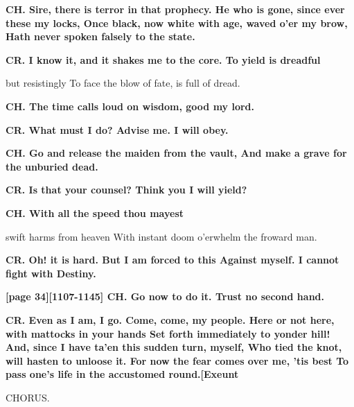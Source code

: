 \documentclass[11pt,letter]{book}
\begin{document}
\par \textbf{CH. Sire, there is terror in that prophecy. He who is gone, since ever these my locks, Once black, now white with age, waved o’er my brow, Hath never spoken falsely to the state.}
\par 

\par \textbf{CR. I know it, and it shakes me to the core. To yield is dreadful}
\par   but resistingly To face the blow of fate, is full of dread.

\par \textbf{CH. The time calls loud on wisdom, good my lord.}
\par 

\par \textbf{CR. What must I do? Advise me. I will obey.}
\par 

\par \textbf{CH. Go and release the maiden from the vault, And make a grave for the unburied dead.}
\par 

\par \textbf{CR. Is that your counsel? Think you I will yield?}
\par 

\par \textbf{CH. With all the speed thou mayest}
\par   swift harms from heaven With instant doom o’erwhelm the froward man.

\par \textbf{CR. Oh! it is hard. But I am forced to this Against myself. I cannot fight with Destiny.}
\par 

\par \textbf{[page 34][1107-1145] CH. Go now to do it. Trust no second hand.}
\par 

\par \textbf{CR. Even as I am, I go. Come, come, my people. Here or not here, with mattocks in your hands Set forth immediately to yonder hill! And, since I have ta’en this sudden turn, myself, Who tied the knot, will hasten to unloose it. For now the fear comes over me, ’tis best To pass one’s life in the accustomed round.[Exeunt}
\par 

\par  CHORUS.
\end{document}
